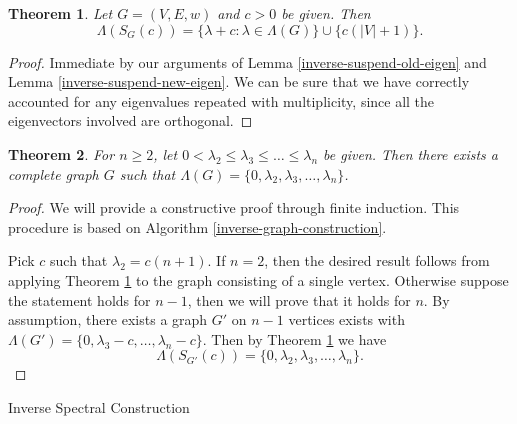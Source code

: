 \documentclass[a4paper,11pt]{article}
\newtheorem{theorem}{Theorem}[section]
\theoremstyle{definition}
\begin{document}
\begin{theorem}\label{inverse-suspension-main}
Let $G = (V, E, w)$ and $c > 0$ be given. Then
\[
\Lambda(S_G(c)) = \{ \lambda + c : \lambda \in \Lambda(G) \} \cup \{ c(|V| + 1) \}.
\]
\end{theorem}
\begin{proof}
Immediate by our arguments of Lemma \ref{inverse-suspend-old-eigen} and Lemma \ref{inverse-suspend-new-eigen}. We can be sure that we have correctly accounted for any eigenvalues repeated with multiplicity, since all the eigenvectors involved are orthogonal.
\end{proof}

\begin{theorem}
For $n \ge 2$, let $0 < \lambda_2 \le \lambda_3 \le \dots \le \lambda_n$ be given. Then there exists a complete graph $G$ such that $\Lambda(G) = \{0, \lambda_2, \lambda_3, \dots, \lambda_n\}$.
\end{theorem}
\begin{proof}

We will provide a constructive proof through finite induction. This procedure is based on Algorithm \ref{inverse-graph-construction}.

Pick $c$ such that $\lambda_2 = c(n + 1)$. If $n = 2$, then the desired result follows from applying Theorem \ref{inverse-suspension-main} to the graph consisting of a single vertex.  Otherwise suppose the statement holds for $n - 1$, then we will prove that it holds for $n$. By assumption, there exists a graph $G'$ on $n-1$ vertices exists with $\Lambda(G') = \{ 0, \lambda_3 - c, \dots, \lambda_n - c \}$. Then by Theorem \ref{inverse-suspension-main} we have
\[
\Lambda(S_{G'}(c)) = \{ 0, \lambda_2, \lambda_3, \dots, \lambda_n \}.
\]
\end{proof}

\begin{algorithm}
\caption{Inverse Spectral Construction}\label{inverse-graph-construction}
\end{algorithm}
\end{document}
